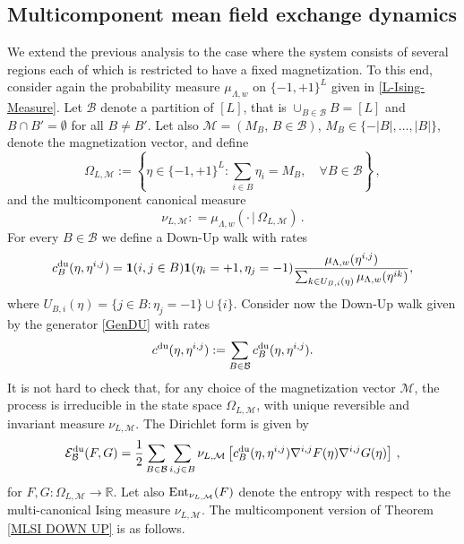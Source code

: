 \documentclass[11pt,reqno]{amsart}
\numberwithin{equation}{section}
\numberwithin{figure}{section}
\newcommand{\ent}{{\rm Ent}}
\newcommand{\1}{\mathds{1}}
\newcommand{\tc}{\,|\,}
\let\O=\Omega
\let\L=\Lambda
\newcommand{\cB}{\ensuremath{\mathcal B}}
\newcommand{\cE}{\ensuremath{\mathcal E}}
\newcommand{\cM}{\ensuremath{\mathcal M}}
\begin{document}
\subsection{Multicomponent mean field exchange dynamics}
We extend the previous analysis to the case where the system consists of several regions each of which is restricted to have a fixed magnetization. To this end, consider again the probability measure $\mu_{\L,w}$ on $\{-1,+1\}^L$ given in \eqref{L-Ising-Measure}.
Let $\cB$ denote a partition of $[L]$, that is $\cup_{B\in\cB}B = [L]$ and $B\cap B'=\emptyset$ for all $B\neq B'$. Let also $\cM=(M_B, \,B\in\cB)$, $M_B\in\{-|B|,\dots,|B|\}$,  denote the magnetization vector, and define
\[
    \Omega_{L,\cM} := \left\{ \eta \in \{-1,+1\}^{L} :\textstyle{ \sum_{i \in B}} \eta_i = M_B, \quad \forall B \in \mathcal{B} \right\}\,,%
\]
and the multicomponent canonical measure
\[
\nu_{L,\cM}: =  \mu_{\L,w}\left(\cdot\tc\O_{L,\cM}\right)\,.
\]
For every $B\in\cB$ we define a Down-Up walk with rates
\begin{equation}\label{RatesDUB}
c^{\rm du}_B(\eta,\eta^{i,j}) = \mathbf{1}(i,j\in B)\mathbf{1}(\eta_i = +1,\eta_j = -1)
\frac{\mu_{\L,w}(\eta^{i,j})}{\sum_{k \in U_{B,i}(\eta)} \mu_{\L,w}(\eta^{ik})},
\end{equation}
where \(U_{B,i}(\eta) = \{j \in B : \eta_j = -1\} \cup \{i\}\). 
Consider now the Down-Up walk given by the generator \eqref{GenDU} with rates 
\[
c^{\rm du}(\eta,\eta^{i,j}):=\sum_{B\in\cB}c^{\rm du}_B(\eta,\eta^{i,j}).
\] 
It is not hard to check that, for any choice of the magnetization vector $\cM$, the process is irreducible in the state space $\O_{L,\cM}$, with unique reversible and invariant measure $\nu_{L,\cM}$. 
The Dirichlet form is given by 
\begin{gather}\label{DirDUB}
\mathcal{E}^{\rm du}_\cB(F,G) =  
\frac{1}{2}\sum_{B\in\cB}\sum_{i,j\in B} \nu_{L,\cM}
\left[ c^{\rm du}_B(\eta,\eta^{i,j})\nabla^{i,j}F(\eta)\nabla^{i,j}G(\eta) \right]\,, 
\end{gather}
for \(F,G : \Omega_{L,\cM} \to \mathbb{R}\).
Let also $\ent_{\nu_{L,\cM}}(F)$ denote the entropy with respect to the multi-canonical Ising measure $\nu_{L,\cM}$.
The multicomponent version of Theorem \ref{MLSI DOWN UP} is as follows. 
\end{document}
